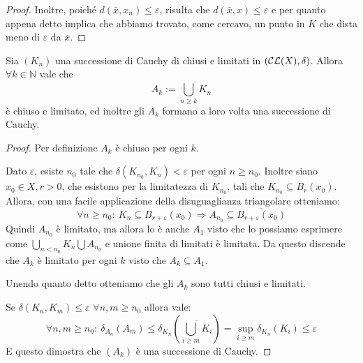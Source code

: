 \begin{proof}
	Inoltre, poiché $d(\bar x,x_n)\le \varepsilon$, risulta che $d(\bar x, x)\le \varepsilon$ e per quanto appena detto implica che abbiamo trovato, come cercavo, un punto in $K$ che dista meno di $\varepsilon$ da $\bar x$.
	
\end{proof}

\begin{lemma} \label{UnioniDiCauchy}
Sia $(K_n)$ una successione di Cauchy di chiusi e limitati in $\left (\mathcal{CL}(X),\delta\right  ) $. 
Allora $\forall k \in \mathbb{N}$ vale che
\begin{equation*}
A_k:=\overline{\bigcup_{n\geq k} K_n}
\end{equation*}
è chiuso e limitato, ed inoltre gli $A_k$ formano a loro volta una successione di Cauchy.
\end{lemma}

\begin{proof}
Per definizione $A_k$ è chiuso per ogni $k$. 

Dato $\varepsilon$, esiste $n_0$ tale che $\delta(K_{n_0}, K_n)< \varepsilon$ per ogni $n\geq n_0$. 
Inoltre siano $x_0\in X,r>0$, che esistono per la limitatezza di $K_{n_0}$, tali che $K_{n_0}\subseteq B_r(x_0)$. 
Allora, con una facile applicazione della disuguaglianza triangolare otteniamo:
\begin{equation*}
	\forall n\ge n_0:\ K_n\subseteq B_{r+\varepsilon}(x_0) \Rightarrow A_{n_0}\subseteq \overline{B_{r+\varepsilon}(x_0)}
\end{equation*}
Quindi $A_{n_0}$ è limitato, ma allora lo è anche $A_1$ visto che lo possiamo esprimere come $\bigcup_{n<n_0}K_n \bigcup A_{n_0}$ e unione finita di limitati è limitata. Da questo discende che $A_k$ è limitato per ogni $k$ visto che $A_k\subseteq A_1$.

Unendo quanto detto otteniamo che gli $A_k$ sono tutti chiusi e limitati.

Se $\delta(K_n, K_m)\leq \varepsilon$ $\forall n,m \geq n_0$  allora vale:
\begin{equation*}
	\forall n,m\ge n_0:\ \delta_{A_n}(A_m)\le \delta_{K_n}\left(\overline{\bigcup_{i\ge m}K_i} \right)
	=\sup_{i\ge m} \delta_{K_n}(K_i) \le \varepsilon
\end{equation*}
E questo dimostra che $(A_k)$ è una successione di Cauchy.
\end{proof}

